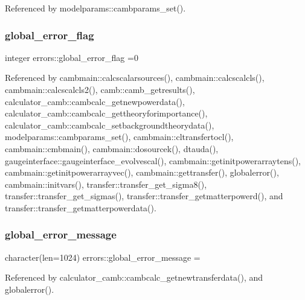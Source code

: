 Referenced by modelparams\+::cambparams\+\_\+set().

\mbox{\label{namespaceerrors_a72cd38a036b5cc55888b987007b85249}} 
\subsubsection{\texorpdfstring{global\+\_\+error\+\_\+flag}{global\_error\_flag}}
{\footnotesize\ttfamily integer errors\+::global\+\_\+error\+\_\+flag =0}



Referenced by cambmain\+::calcscalarsources(), cambmain\+::calcscalcls(), cambmain\+::calcscalcls2(), camb\+::camb\+\_\+getresults(), calculator\+\_\+camb\+::cambcalc\+\_\+getnewpowerdata(), calculator\+\_\+camb\+::cambcalc\+\_\+gettheoryforimportance(), calculator\+\_\+camb\+::cambcalc\+\_\+setbackgroundtheorydata(), modelparams\+::cambparams\+\_\+set(), cambmain\+::cltransfertocl(), cambmain\+::cmbmain(), cambmain\+::dosourcek(), dtauda(), gaugeinterface\+::gaugeinterface\+\_\+evolvescal(), cambmain\+::getinitpowerarraytens(), cambmain\+::getinitpowerarrayvec(), cambmain\+::gettransfer(), globalerror(), cambmain\+::initvars(), transfer\+::transfer\+\_\+get\+\_\+sigma8(), transfer\+::transfer\+\_\+get\+\_\+sigmas(), transfer\+::transfer\+\_\+getmatterpowerd(), and transfer\+::transfer\+\_\+getmatterpowerdata().

\mbox{\label{namespaceerrors_abab090a06678767efd048592898c9a59}} 
\subsubsection{\texorpdfstring{global\+\_\+error\+\_\+message}{global\_error\_message}}
{\footnotesize\ttfamily character(len=1024) errors\+::global\+\_\+error\+\_\+message = \textquotesingle{}\textquotesingle{}}



Referenced by calculator\+\_\+camb\+::cambcalc\+\_\+getnewtransferdata(), and globalerror().

